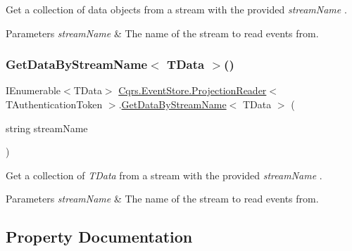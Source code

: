 Get a collection of data objects from a stream with the provided {\itshape stream\+Name} . 


\begin{DoxyParams}{Parameters}
{\em stream\+Name} & The name of the stream to read events from.\\
\hline
\end{DoxyParams}
\mbox{\label{classCqrs_1_1EventStore_1_1ProjectionReader_adb256fc2c761a0add40c84fe2c1cb6e8_adb256fc2c761a0add40c84fe2c1cb6e8}} 
\subsubsection{\texorpdfstring{Get\+Data\+By\+Stream\+Name$<$ T\+Data $>$()}{GetDataByStreamName< TData >()}}
{\footnotesize\ttfamily I\+Enumerable$<$T\+Data$>$ \hyperlink{classCqrs_1_1EventStore_1_1ProjectionReader}{Cqrs.\+Event\+Store.\+Projection\+Reader}$<$ T\+Authentication\+Token $>$.\hyperlink{classCqrs_1_1EventStore_1_1ProjectionReader_adcc229abde429acfa6b125b3a93a85b4_adcc229abde429acfa6b125b3a93a85b4}{Get\+Data\+By\+Stream\+Name}$<$ T\+Data $>$ (\begin{DoxyParamCaption}\item[{string}]{stream\+Name }\end{DoxyParamCaption})\hspace{0.3cm}{\ttfamily [protected]}}



Get a collection of {\itshape T\+Data}  from a stream with the provided {\itshape stream\+Name} . 


\begin{DoxyParams}{Parameters}
{\em stream\+Name} & The name of the stream to read events from.\\
\hline
\end{DoxyParams}


\subsection{Property Documentation}
\mbox{\label{classCqrs_1_1EventStore_1_1ProjectionReader_a2c7ada08a9525c161eb7e42e2dbf55e0_a2c7ada08a9525c161eb7e42e2dbf55e0}} 

